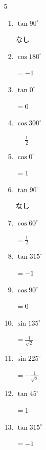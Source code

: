 \begin{multicols}{5}
\begin{enumerate}
        $\displaystyle =-\frac{1}{\sqrt{2}}$

  \item $\displaystyle \tan{90^\circ}$

        $\displaystyle なし$

  \item $\displaystyle \cos{180^\circ}$

        $\displaystyle =-1$

  \item $\displaystyle \tan{0^\circ}$

        $\displaystyle =0$

  \item $\displaystyle \cos{300^\circ}$

        $\displaystyle =\frac{1}{2}$

  \item $\displaystyle \cos{0^\circ}$

        $\displaystyle =1$

  \item $\displaystyle \tan{90^\circ}$

        $\displaystyle なし$

\columnbreak %

  \item $\displaystyle \cos{60^\circ}$

        $\displaystyle =\frac{1}{2}$

  \item $\displaystyle \tan{315^\circ}$

        $\displaystyle =-1$

  \item $\displaystyle \cos{90^\circ}$

        $\displaystyle =0$

  \item $\displaystyle \sin{135^\circ}$

        $\displaystyle =\frac{1}{\sqrt{2}}$

  \item $\displaystyle \sin{225^\circ}$

        $\displaystyle =-\frac{1}{\sqrt{2}}$

  \item $\displaystyle \tan{45^\circ}$

        $\displaystyle =1$

  \item $\displaystyle \tan{315^\circ}$

        $\displaystyle =-1$


\end{enumerate}
\end{multicols}
